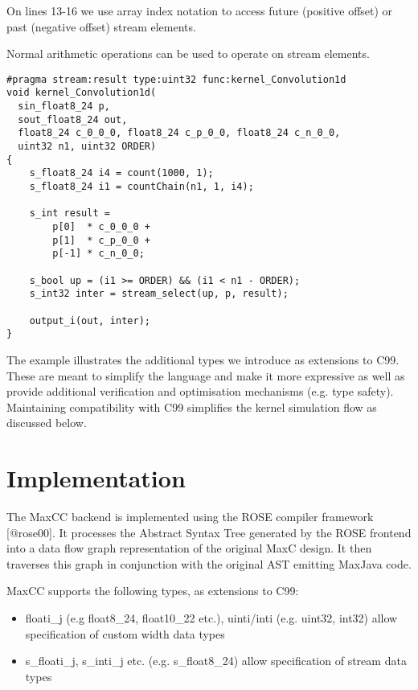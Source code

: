 \documentclass[conference]{IEEEtran}
\begin{document}
On lines 13-16 we use array index notation to access future (positive
offset) or past (negative offset) stream elements.

Normal arithmetic operations can be used to operate on stream
elements.

\lstset{style=MaxC}

\begin{lstlisting}
#pragma stream:result type:uint32 func:kernel_Convolution1d
void kernel_Convolution1d(
  sin_float8_24 p,
  sout_float8_24 out,
  float8_24 c_0_0_0, float8_24 c_p_0_0, float8_24 c_n_0_0,
  uint32 n1, uint32 ORDER)
{
    s_float8_24 i4 = count(1000, 1);
    s_float8_24 i1 = countChain(n1, 1, i4);

    s_int result =
        p[0]  * c_0_0_0 +
        p[1]  * c_p_0_0 +
        p[-1] * c_n_0_0;

    s_bool up = (i1 >= ORDER) && (i1 < n1 - ORDER);
    s_int32 inter = stream_select(up, p, result);

    output_i(out, inter);
}
\end{lstlisting}

The example illustrates the additional types we introduce as
extensions to C99. These are meant to simplify the language and make
it more expressive as well as provide additional verification and
optimisation mechanisms (e.g. type safety). Maintaining compatibility
with C99 simplifies the kernel simulation flow as discussed below.

\section{Implementation}

The MaxCC backend is implemented using the ROSE compiler framework
[@rose00]. It processes the Abstract Syntax Tree generated by the ROSE
frontend into a data flow graph representation of the original MaxC
design. It then traverses this graph in conjunction with the original
AST emitting MaxJava code.

MaxCC supports the following types, as extensions to C99:

\begin{itemize}
\item floati\_j (e.g float8\_24, float10\_22 etc.), uinti/inti
  (e.g. uint32, int32) allow specification of custom width data
  types

\item s\_floati\_j, s\_inti\_j etc. (e.g. s\_float8\_24) allow specification of
  stream data types
\end{itemize}
\end{document}
